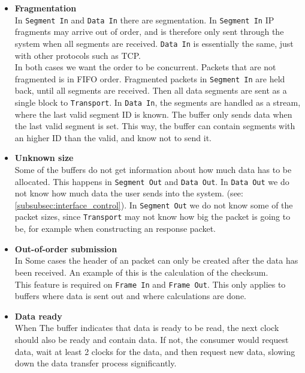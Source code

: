 \begin{itemize}
    \item \textbf{Fragmentation}\\
    In \texttt{Segment In} and \texttt{Data In} there are segmentation. In
    \texttt{Segment In} IP fragments may arrive out of order, and is therefore only
    sent through the system when all segments are received. \texttt{Data In} is
    essentially the same, just with other protocols such as TCP.\\
    In both cases we want the order to be concurrent. Packets that are not
    fragmented is in FIFO order. Fragmented packets in \texttt{Segment In} are
    held back, until all segments are received. Then all data segments are sent
    as a single block to \texttt{Transport}. In \texttt{Data In}, the segments are
    handled as a stream, where the last valid segment ID is known. The buffer
    only sends data when the last valid segment is set. This way, the buffer
    can contain segments with an higher ID than the valid, and know not to send it.


    \item \textbf{Unknown size}\\
    Some of the buffers do not get information about how much data has to be
    allocated. This happens in \texttt{Segment Out} and \texttt{Data Out}.
    In \texttt{Data Out} we do not know how much data the user sends into
    the system. (see: \autoref{subsubsec:interface_control}). In
    \texttt{Segment Out} we do not know some of the packet sizes, since
    \texttt{Transport} may not know how big the packet is going to be, for
    example when constructing an response packet.


    \item \textbf{Out-of-order submission}\\
    In Some cases the header of an packet can only be created after the data
    has been received. An example of this is the calculation of the checksum.\\
    This feature is required on \texttt{Frame In} and \texttt{Frame Out}.
    This only applies to buffers where data is sent out and where calculations
    are done.

    \item \textbf{Data ready}\\
    When The buffer indicates that data is ready to be read, the next clock
    should also be ready and contain data. If not, the consumer would request
    data, wait at least 2 clocks for the data, and then request new data,
    slowing down the data transfer process significantly.

\end{itemize}
